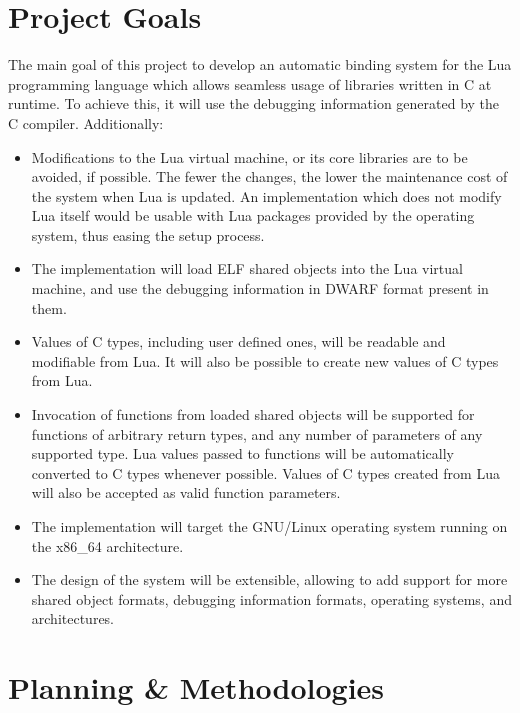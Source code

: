 \section{Project Goals}
	\label{sec:project-goals}

The main goal of this project to develop an automatic binding system for the
Lua programming language which allows seamless usage of libraries written in
C at runtime. To achieve this, it will use the debugging information generated
by the C compiler. Additionally:

\begin{itemize}

	\item Modifications to the Lua virtual machine, or its core libraries are to
	be avoided, if possible. The fewer the changes, the lower the maintenance
	cost of the system when Lua is updated. An implementation which does not
	modify Lua itself would be usable with Lua packages provided by the
	operating system, thus easing the setup process.

	\item The implementation will load \gls{ELF} shared objects into the Lua
	virtual machine, and use the debugging information in \gls{DWARF} format
	present in them.

	\item Values of C types, including user defined ones, will be readable and
	modifiable from Lua. It will also be possible to create new values of
	C types from Lua.

	\item Invocation of functions from loaded shared objects will be supported
	for functions of arbitrary return types, and any number of parameters of any
	supported type. Lua values passed to functions will be automatically
	converted to C types whenever possible. Values of C types created from Lua
	will also be accepted as valid function parameters.

	\item The implementation will target the GNU/Linux operating system running
	on the x86\_64 architecture.

	\item The design of the system will be extensible, allowing to add support
	for more shared object formats, debugging information formats, operating
	systems, and architectures.

\end{itemize}


\section{Planning \& Methodologies}

